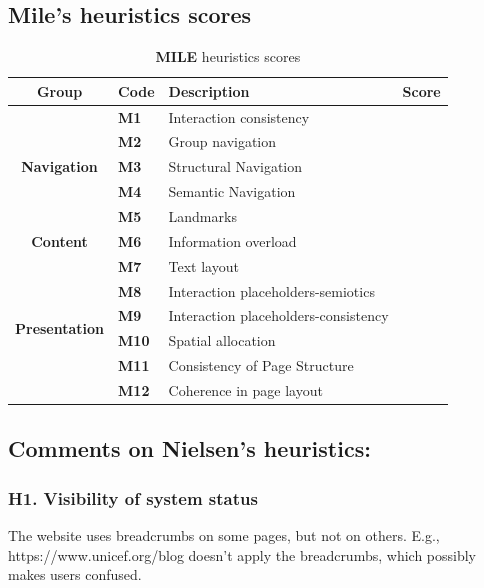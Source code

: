 \subsection{Mile’s heuristics scores}
\begin{table}[htp!]
	\centering
	\begin{tabular}{ |c|l|l|c| }
		\hline
		\textbf{Group} & \textbf{Code} & \textbf{Description} & \textbf{Score}\\
		\hline
		\multirow{5}{*}{\textbf{Navigation}} & \textbf{M1} & Interaction consistency & \textbf{\color{unicefGreen}{4}}\\
		\cline{2-4}
		& \textbf{M2} & Group navigation & \textbf{\color{unicefGreen}{4}}\\
		\cline{2-4}
		& \textbf{M3} & Structural Navigation & \textbf{\color{unicefGreen}{4}}\\
		\cline{2-4}
		& \textbf{M4} & Semantic Navigation & \textbf{\color{unicefGreen}{5}}\\
		\cline{2-4}
		& \textbf{M5} & Landmarks & \textbf{\color{unicefGreen}{4}}\\
		\hline
		\textbf{Content} & \textbf{M6} & Information overload & \textbf{\color{unicefGreen}{4}}\\
		\hline
		\multirow{6}{*}{\textbf{Presentation}} & \textbf{M7} & Text layout & \textbf{\color{unicefGreen}{5}}\\
		\cline{2-4}
		& \textbf{M8} & Interaction placeholders-semiotics & \textbf{\color{unicefGreen}{4}}\\
		\cline{2-4}
		& \textbf{M9} & Interaction placeholders-consistency & \textbf{\color{unicefGreen}{4}}\\
		\cline{2-4}
		& \textbf{M10} & Spatial allocation & \textbf{\color{unicefGreen}{4}}\\
		\cline{2-4}
		& \textbf{M11} & Consistency of Page Structure & \textbf{\color{unicefGreen}{4}}\\
		\cline{2-4}
		& \textbf{M12} & Coherence in page layout & \textbf{\color{unicefGreen}{5}}\\
		\hline
	\end{tabular}
	\caption{\textbf{MILE} heuristics scores}
\end{table}

\subsection{Comments on Nielsen’s heuristics:}
\subsubsection*{H1. Visibility of system status}
The website uses breadcrumbs on some pages, but not on others. E.g., https://www.unicef.org/blog doesn't apply the breadcrumbs, which possibly makes users confused.

